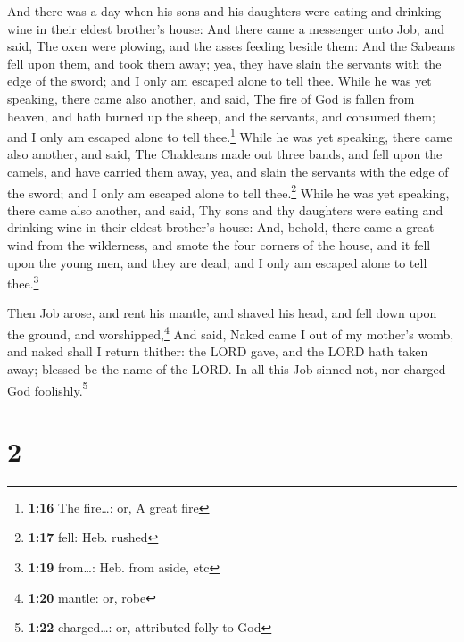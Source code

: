  And there was a day when his sons and his daughters were
eating and drinking wine in their eldest brother's house:
 And there came a messenger unto Job, and said, The oxen
were plowing, and the asses feeding beside them:  And the
Sabeans fell upon them, and took them away; yea, they have slain the
servants with the edge of the sword; and I only am escaped alone to tell
thee.  While he was yet speaking, there came also
another, and said, The fire of God is fallen from heaven, and hath
burned up the sheep, and the servants, and consumed them; and I only am
escaped alone to tell thee.\footnote{\textbf{1:16} The fire\ldots: or, A
  great fire}  While he was yet speaking, there came also
another, and said, The Chaldeans made out three bands, and fell upon the
camels, and have carried them away, yea, and slain the servants with the
edge of the sword; and I only am escaped alone to tell thee.\footnote{\textbf{1:17}
  fell: Heb. rushed}  While he was yet speaking, there
came also another, and said, Thy sons and thy daughters were eating and
drinking wine in their eldest brother's house:  And,
behold, there came a great wind from the wilderness, and smote the four
corners of the house, and it fell upon the young men, and they are dead;
and I only am escaped alone to tell thee.\footnote{\textbf{1:19}
  from\ldots: Heb. from aside, etc}

 Then Job arose, and rent his mantle, and shaved his
head, and fell down upon the ground, and worshipped,\footnote{\textbf{1:20}
  mantle: or, robe}  And said, Naked came I out of my
mother's womb, and naked shall I return thither: the LORD gave, and the
LORD hath taken away; blessed be the name of the LORD. 
In all this Job sinned not, nor charged God foolishly.\footnote{\textbf{1:22}
  charged\ldots: or, attributed folly to God}

\hypertarget{section-1}{%
\section{2}\label{section-1}}

